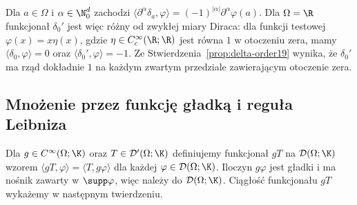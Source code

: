 \begin{przyklad}
\label{ex:delta-derivative20}
Dla $a\in\Omega$ i $\alpha\in\N_0^d$ zachodzi
$\langle\partial^\alpha\delta_a,\varphi\rangle
=(-1)^{|\alpha|}\partial^\alpha\varphi(a)$.
Dla $\Omega=\R$ funkcjonał $\delta_0'$ jest więc różny
od zwykłej miary Diraca: dla funkcji testowej
$\varphi(x)=x\eta(x)$, gdzie $\eta\in C_c^\infty(\R;\R)$
jest równa $1$ w otoczeniu zera, mamy
$\langle\delta_0,\varphi\rangle=0$ oraz
$\langle\delta_0',\varphi\rangle=-1$.
Ze Stwierdzenia~\ref{prop:delta-order19} wynika,
że $\delta_0'$ ma rząd dokładnie $1$ na każdym zwartym
przedziale zawierającym otoczenie zera.
\end{przyklad}

\subsection{Mnożenie przez funkcję gładką i reguła Leibniza}

\begin{definicja}
\label{def:multiply20}
Dla $g\in C^\infty(\Omega;\K)$ oraz $T\in\mathcal D'(\Omega;\K)$
definiujemy funkcjonał $gT$ na $\mathcal D(\Omega;\K)$ wzorem
$\langle gT,\varphi\rangle=\langle T,g\varphi\rangle$
dla każdej $\varphi\in\mathcal D(\Omega;\K)$.
Iloczyn $g\varphi$ jest gładki i ma nośnik zawarty w
$\supp\varphi$, więc należy do $\mathcal D(\Omega;\K)$.
Ciągłość funkcjonału $gT$ wykażemy w następnym twierdzeniu.
\end{definicja}

